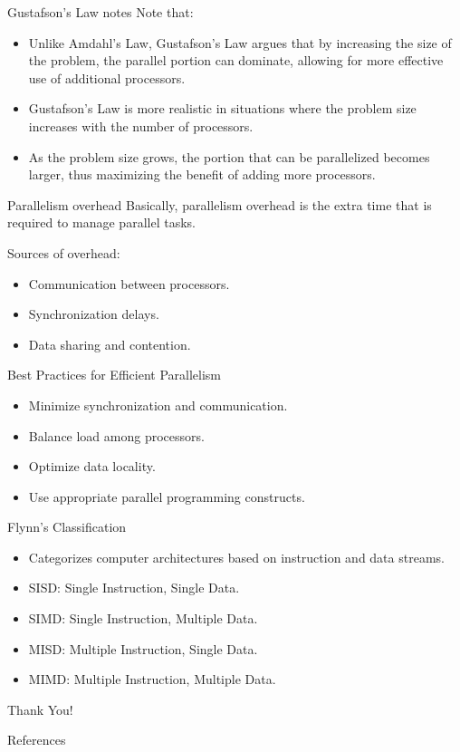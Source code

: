 \documentclass{beamer}
\begin{document}
\begin{frame}{Gustafson's Law notes}
  Note that:
  \begin{itemize}
    \item Unlike Amdahl's Law, Gustafson's Law argues that by increasing the size of the problem, the parallel portion can dominate, allowing for more effective use of additional processors.
    \item Gustafson's Law is more realistic in situations where the problem size increases with the number of processors.
    \item As the problem size grows, the portion that can be parallelized becomes larger, thus maximizing the benefit of adding more processors.
  \end{itemize}
\end{frame}

\begin{frame}{Parallelism overhead}
  Basically, parallelism overhead is the extra time that is required to manage parallel tasks.

  Sources of overhead:
  \begin{itemize}
    \item Communication between processors.
    \item Synchronization delays.
    \item Data sharing and contention.
  \end{itemize}
\end{frame}

\begin{frame}{Best Practices for Efficient Parallelism}
  \begin{itemize}
    \item Minimize synchronization and communication.
    \item Balance load among processors.
    \item Optimize data locality.
    \item Use appropriate parallel programming constructs.
  \end{itemize}
\end{frame}

\begin{frame}{Flynn's Classification}
  \begin{itemize}
    \item Categorizes computer architectures based on instruction and data streams.
    \item SISD: Single Instruction, Single Data.
    \item SIMD: Single Instruction, Multiple Data.
    \item MISD: Multiple Instruction, Single Data.
    \item MIMD: Multiple Instruction, Multiple Data.
  \end{itemize}
\end{frame}

\begin{frame}
    \centering
    \Huge{Thank You!}
\end{frame}

\begin{frame}{References}
\end{frame}
\end{document}
